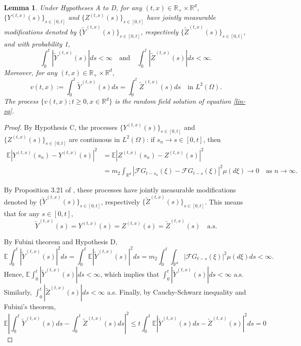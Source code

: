 \documentclass[12pt]{article}
\newtheorem{lemma}[theorem]{Lemma}
\def\cF{\mathcal{F}}
\def\bE{\mathbb{E}}
\def\bR{\mathbb{R}}
\begin{document}
\begin{lemma}
Under Hypotheses A to D, for any $(t,x)\in \bR_{+} \times \bR^d$,  $\{Y^{(t,x)}(s)\}_{s \in [0,t]}$ and $\{Z^{(t,x)}(s)\}_{s \in [0,t]}$ have jointly measurable modifications denoted by $\{\widetilde{Y}^{(t,x)}(s)\}_{s \in [0,t]}$, respectively $\{\widetilde{Z}^{(t,x)}(s)\}_{s \in [0,t]}$, and with probability 1,
\[
\int_0^t |\widetilde{Y}^{(t,x)}(s)|ds<\infty \quad \mbox{and} \quad \int_0^t |\widetilde{Z}^{(t,x)}(s)|ds<\infty.
\]
Moreover, for any $(t,x)\in \bR_{+} \times \bR^d$,
\[
v(t,x):=\int_0^t \widetilde{Y}^{(t,x)}(s)ds=\int_0^t \widetilde{Z}^{(t,x)}(s)ds \quad \mbox{in $L^2(\Omega)$}.
\]
The process $\{v(t,x); t\geq 0,x\in \bR^d\}$ is the random field solution of equation \eqref{lin-eq}.
\end{lemma}

\begin{proof}
By Hypothesis C, the processes $\{Y^{(t,x)}(s)\}_{s \in [0,t]}$ and $\{Z^{(t,x)}(s)\}_{s \in [0,t]}$  are continuous in $L^2(\Omega)$: if $s_n \to s \in [0,t]$, then
\begin{align*}
\bE|Y^{(t,x)}(s_n)-Y^{(t,x)}(s)|^2 &= 
\bE|Z^{(t,x)}(s_n)-Z^{(t,x)}(s)|^2 \\%
&=m_2\int_{\bR^d}|\cF G_{t-s_n}(\xi)-\cF G_{t-s}(\xi)|^2 \mu(d\xi) \to 0 \quad \mbox{as $n \to \infty$}.
\end{align*}
 
By Proposition 3.21 of \cite{PZ07}, these processes have jointly measurable modifications denoted by $\{\widetilde{Y}^{(t,x)}(s)\}_{s \in [0,t]}$, respectively $\{\widetilde{Z}^{(t,x)}(s)\}_{s \in [0,t]}$. This means that for any $s \in [0,t]$,
\[
\widetilde{Y}^{(t,x)}(s)=Y^{(t,x)}(s)=Z^{(t,x)}(s)=\widetilde{Z}^{(t,x)}(s) \quad \mbox{a.s.}
\]


By Fubini theorem and Hypothesis D,
\[
\bE\int_0^t |\widetilde{Y}^{(t,x)}(s)|^2 ds=\int_0^t \bE|\widetilde{Y}^{(t,x)}(s)|^2 ds=m_2\int_0^t \int_{\bR^d}|\cF G_{t-s}(\xi)|^2 \mu(d\xi) ds <\infty.
\]
Hence, $\bE\int_0^t |\widetilde{Y}^{(t,x)}(s)|ds<\infty$, which implies that $\int_0^t |\widetilde{Y}^{(t,x)}(s)|ds<\infty$ a.s. Similarly, $\int_0^t |\widetilde{Z}^{(t,x)}(s)|ds<\infty$ a.s. 
Finally, by Cauchy-Schwarz inequality and Fubini's theorem,
\[
\bE
\left|\int_0^t \widetilde{Y}^{(t,x)}(s)ds- \int_0^t \widetilde{Z}^{(t,x)}(s)ds \right|^2 \leq t  \int_0^t 
\bE| \widetilde{Y}^{(t,x)}(s)ds-  \widetilde{Z}^{(t,x)}(s)|^2 ds=0
\]

\end{proof}
\end{document}
